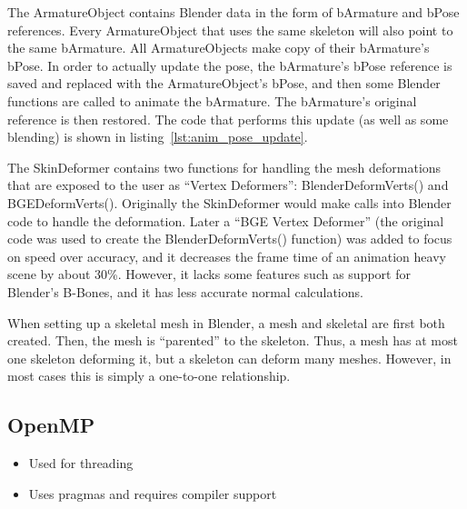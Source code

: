 The ArmatureObject contains Blender data in the form of bArmature and bPose references. Every ArmatureObject that uses the same skeleton will also point to the same bArmature. All ArmatureObjects make copy of their bArmature's bPose. In order to actually update the pose, the bArmature's bPose reference is saved and replaced with the ArmatureObject's bPose, and then some Blender functions are called to animate the bArmature. The bArmature's original reference is then restored. The code that performs this update (as well as some blending) is shown in listing~\ref{lst:anim_pose_update}.


The SkinDeformer contains two functions for handling the mesh deformations that are exposed to the user as ``Vertex Deformers'': BlenderDeformVerts() and BGEDeformVerts(). Originally the SkinDeformer would make calls into Blender code to handle the deformation. Later a ``BGE Vertex Deformer'' (the original code was used to create the BlenderDeformVerts() function) was added to focus on speed over accuracy, and it decreases the frame time of an animation heavy scene by about 30\%. However, it lacks some features such as support for Blender's B-Bones, and it has less accurate normal calculations.

When setting up a skeletal mesh in Blender, a mesh and skeletal are first both created. Then, the mesh is ``parented'' to the skeleton. Thus, a mesh has at most one skeleton deforming it, but a skeleton can deform many meshes. However, in most cases this is simply a one-to-one relationship.

\subsection{OpenMP}
\begin{itemize}
 \item Used for threading
 \item Uses pragmas and requires compiler support
\end{itemize}



%

